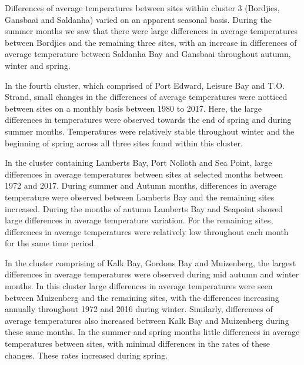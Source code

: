 \documentclass[12pt,]{article}
\begin{document}
Differences of average temperatures between sites within cluster 3
(Bordjies, Gansbaai and Saldanha) varied on an apparent seasonal basis.
During the summer months we saw that there were large differences in
average temperatures between Bordjies and the remaining three sites,
with an increase in differences of average temperature between Saldanha
Bay and Gansbaai throughout autumn, winter and spring.

In the fourth cluster, which comprised of Port Edward, Leisure Bay and
T.O. Strand, small changes in the differences of average temperatures
were notticed between sites on a monthly basis between 1980 to 2017.
Here, the large differences in temperatures were observed towards the
end of spring and during summer months. Temperatures were relatively
stable throughout winter and the beginning of spring across all three
sites found within this cluster.

In the cluster containing Lamberts Bay, Port Nolloth and Sea Point,
large differences in average temperatures between sites at selected
months between 1972 and 2017. During summer and Autumn months,
differences in average temperature were observed between Lamberts Bay
and the remaining sites increased. During the months of autumn Lamberts
Bay and Seapoint showed large differences in average temperature
variation. For the remaining sites, differences in average temperatures
were relatively low throughout each month for the same time period.

In the cluster comprising of Kalk Bay, Gordons Bay and Muizenberg, the
largest differences in average temperatures were observed during mid
autumn and winter months. In this cluster large differences in average
temperatures were seen between Muizenberg and the remaining sites, with
the differences increasing annually throughout 1972 and 2016 during
winter. Similarly, differences of average temperatures also increased
between Kalk Bay and Muizenberg during these same months. In the summer
and spring months little differences in average temperatures between
sites, with minimal differences in the rates of these changes. These
rates increased during spring.
\end{document}
